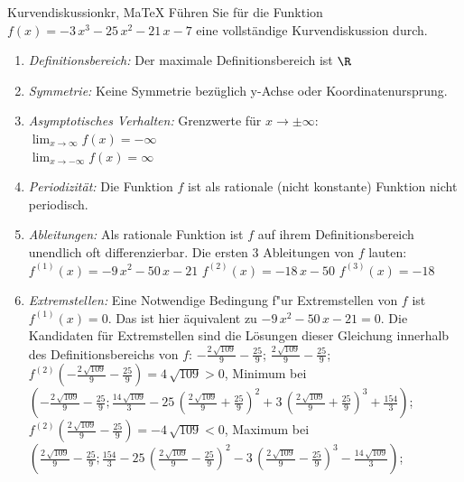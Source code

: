  \providecommand{\MoIl}{(} 
 \providecommand{\MoIr}{)}
 \providecommand{\MIntvlSep}{;} 
 \providecommand{\MElSetSep}{;} 
 \begin{MAufgabe}{Kurvendiskussion}{kr, MaTeX}
 F\"uhren Sie f\"ur die Funktion $f(x)= - 3\, x^3 - 25\, x^2 - 21\, x - 7$ eine vollst\"andige Kurvendiskussion durch.\\ 
 \ifLsg\Loesung
 \begin{enumerate}
 \item \emph{Definitionsbereich:} 
 Der maximale Definitionsbereich ist $\R$\item \emph{Symmetrie:} 
 Keine Symmetrie bez\"uglich y-Achse oder Koordinatenursprung.\item \emph{Asymptotisches Verhalten:} 
 Grenzwerte f\"ur $x\rightarrow \pm \infty$: \\ 
 $\lim_{x\rightarrow \infty} f(x)=- \infty$ \\ 
 $\lim_{x\rightarrow -\infty} f(x)=\infty$ \\ 
 \item \emph{Periodizit\"at:} 
 Die Funktion $f$ ist als rationale (nicht konstante) Funktion nicht periodisch.\item \emph{Ableitungen:} 
 Als rationale Funktion ist $f$ auf ihrem Definitionsbereich unendlich oft differenzierbar. 
 Die ersten 3 Ableitungen von $f$ lauten: \\ 
 $f^{(1)}(x)= - 9\, x^2 - 50\, x - 21$\newline 
  $f^{(2)}(x)= - 18\, x - 50$\newline 
  $f^{(3)}(x)=-18$\newline 
  \item \emph{Extremstellen:} 
 Eine Notwendige Bedingung f"ur Extremstellen von $f$ ist $f^{(1)}(x)=0$. 
 Das ist hier \"aquivalent zu $ - 9\, x^2 - 50\, x - 21=0$. 
 Die Kandidaten f\"ur Extremstellen sind die L\"osungen dieser Gleichung innerhalb des Definitionsbereichs von $f$: $ - \frac{2\, \sqrt{109}}{9} - \frac{25}{9}$; $\frac{2\, \sqrt{109}}{9} - \frac{25}{9}$; \\ 
 $f^{(2)}( - \frac{2\, \sqrt{109}}{9} - \frac{25}{9})=4\, \sqrt{109}$$>0$, Minimum bei $( - \frac{2\, \sqrt{109}}{9} - \frac{25}{9};\frac{14\, \sqrt{109}}{3} - 25\, {\left(\frac{2\, \sqrt{109}}{9} + \frac{25}{9}\right)}^2 + 3\, {\left(\frac{2\, \sqrt{109}}{9} + \frac{25}{9}\right)}^3 + \frac{154}{3})$; \\ 
 $f^{(2)}(\frac{2\, \sqrt{109}}{9} - \frac{25}{9})=- 4\, \sqrt{109}$$<0$, Maximum bei $(\frac{2\, \sqrt{109}}{9} - \frac{25}{9};\frac{154}{3} - 25\, {\left(\frac{2\, \sqrt{109}}{9} - \frac{25}{9}\right)}^2 - 3\, {\left(\frac{2\, \sqrt{109}}{9} - \frac{25}{9}\right)}^3 - \frac{14\, \sqrt{109}}{3})$; \\ 

\end{enumerate}
\end{MAufgabe}
